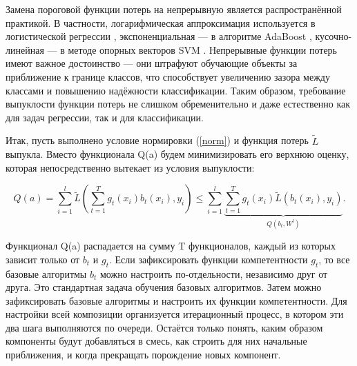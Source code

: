 Замена пороговой функции потерь на непрерывную является распространённой практикой. В частности, логарифмическая аппроксимация используется в логистической регрессии , экспоненциальная — в алгоритме AdaBoost , кусочно-линейная — в методе опорных векторов SVM . Непрерывные функции потерь имеют важное достоинство — они штрафуют обучающие объекты за приближение к границе классов, что способствует увеличению зазора между классами и повышению надёжности классификации. Таким образом, требование выпуклости функции потерь не слишком обременительно и даже естественно как для задач регрессии, так и для классификации.

Итак, пусть выполнено условие нормировки (\ref{norm}) и функция потерь $\widetilde{L}$ выпукла. Вместо функционала Q(a) будем минимизировать его верхнюю оценку, которая непосредственно вытекает из условия выпуклости:

\begin{equation}
    Q(a) = \sum_{i=1}^{l} \widetilde{L}(\sum_{t=1}^{T} g_{t}(x_{i})b_{t}(x_{i}), y_{i}) \leq \sum_{i=1}^{l}\underbrace{\sum_{t=1}^{T} g_{t}(x_{i}) \widetilde{L}(b_{t}(x_{i}), y_{i})}_{Q(b_{t},W^{l})}.
    \label{qa}
\end{equation}


Функционал Q(a) распадается на сумму T функционалов, каждый из которых зависит только от $b_{t}$ и $g_{t}$. Если зафиксировать функции компетентности $g_{t}$, то все базовые алгоритмы $b_{t}$ можно настроить по-отдельности, независимо друг от друга. Это стандартная задача обучения базовых алгоритмов. Затем можно зафиксировать базовые алгоритмы и настроить их функции компетентности. Для настройки всей композиции организуется итерационный процесс, в котором эти два шага выполняются по очереди. Остаётся только понять, каким образом компоненты будут добавляться в смесь, как строить для них начальные приближения, и когда прекращать порождение новых компонент.


